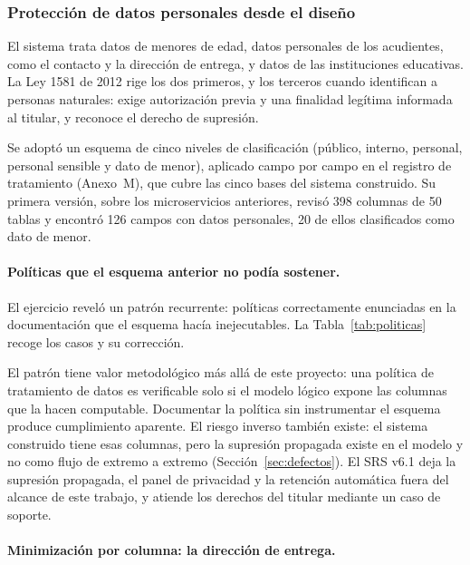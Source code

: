 \subsubsection{Protección de datos personales desde el diseño}


El sistema trata datos de menores de edad, datos personales de los acudientes, como el
contacto y la dirección de entrega, y datos de las instituciones educativas. La Ley 1581 de
2012 \citep{congreso_ley1581_2012} rige los dos primeros, y los terceros cuando identifican
a personas naturales: exige autorización previa y una finalidad legítima informada al
titular, y reconoce el derecho de supresión.

Se adoptó un esquema de cinco niveles de clasificación (público, interno, personal,
personal sensible y dato de menor), aplicado campo por campo en el registro de tratamiento
(Anexo~M), que cubre las cinco bases del sistema construido. Su primera versión, sobre los
microservicios anteriores, revisó 398 columnas de 50 tablas y encontró 126 campos con datos
personales, 20 de ellos clasificados como dato de menor.

\paragraph{Políticas que el esquema anterior no podía sostener.}

El ejercicio reveló un patrón recurrente: políticas correctamente enunciadas en la
documentación que el esquema hacía inejecutables. La Tabla~\ref{tab:politicas} recoge los
casos y su corrección.



El patrón tiene valor metodológico más allá de este proyecto: una política de tratamiento
de datos es verificable solo si el modelo lógico expone las columnas que la hacen
computable. Documentar la política sin instrumentar el esquema produce cumplimiento
aparente. El riesgo inverso también existe: el sistema construido tiene esas columnas, pero
la supresión propagada existe en el modelo y no como flujo de extremo a extremo
(Sección~\ref{sec:defectos}). El SRS v6.1 deja la supresión propagada, el panel de privacidad
y la retención automática fuera del alcance de este trabajo, y atiende los derechos del
titular mediante un caso de soporte.

\paragraph{Minimización por columna: la dirección de entrega.}

